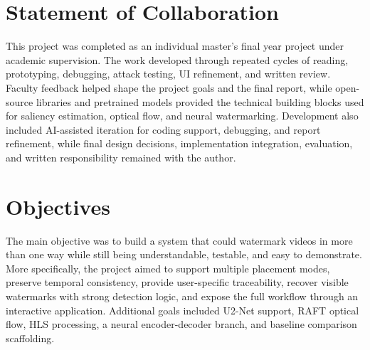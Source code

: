 \documentclass[12pt,oneside]{report}
\begin{document}
\section{Statement of Collaboration}
This project was completed as an individual master's final year project under academic supervision. The work developed through repeated cycles of reading, prototyping, debugging, attack testing, UI refinement, and written review. Faculty feedback helped shape the project goals and the final report, while open-source libraries and pretrained models provided the technical building blocks used for saliency estimation, optical flow, and neural watermarking. Development also included AI-assisted iteration for coding support, debugging, and report refinement, while final design decisions, implementation integration, evaluation, and written responsibility remained with the author.

\section{Objectives}
The main objective was to build a system that could watermark videos in more than one way while still being understandable, testable, and easy to demonstrate. More specifically, the project aimed to support multiple placement modes, preserve temporal consistency, provide user-specific traceability, recover visible watermarks with strong detection logic, and expose the full workflow through an interactive application. Additional goals included U2-Net support, RAFT optical flow, HLS processing, a neural encoder-decoder branch, and baseline comparison scaffolding.
\end{document}
